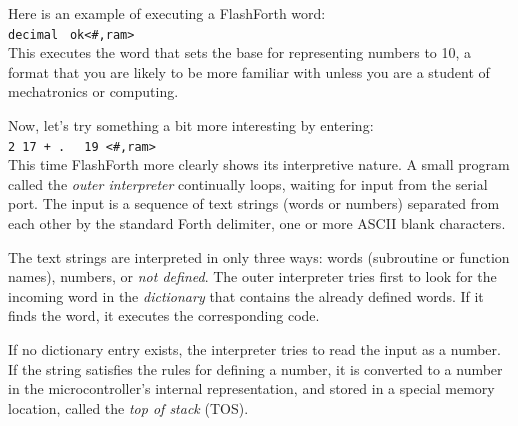 \documentclass[12pt,a4paper]{article}
\begin{document}
\medskip
Here is an example of executing a FlashForth word: \vspace{7pt} \\
\verb!decimal ! \fbox{$\hookleftarrow$} \verb!ok<#,ram>! \vspace{7pt} \\
This executes the word that sets the base for representing numbers to 10, 
a format that you are likely to be more familiar with
unless you are a student of mechatronics or computing.

\medskip
Now, let's try something a bit more interesting by entering: \vspace{7pt} \\
\verb!2 17 + . ! \fbox{$\hookleftarrow$} \verb! 19 <#,ram>! \vspace{7pt} \\
This time FlashForth more clearly shows its interpretive nature.
A small program called the \textit{outer interpreter} continually loops,
waiting for input from the serial port.
The input is a sequence of text strings (words or numbers) separated from each other
by the standard Forth delimiter, one or more ASCII blank characters.

\medskip
The text strings are interpreted in only three ways: words (subroutine or function names),
numbers, or \textit{not defined}.
The outer interpreter tries first to look for the incoming word in the \textit{dictionary}
that contains the already defined words.
If it finds the word, it executes the corresponding code.


\medskip
If no dictionary entry exists, the interpreter tries to read the input as a number.  
If the string satisfies the rules for defining a number, it is converted to a number
in the microcontroller's internal representation, and stored in a special memory location,
called the \textit{top of stack} (TOS).
\end{document}
